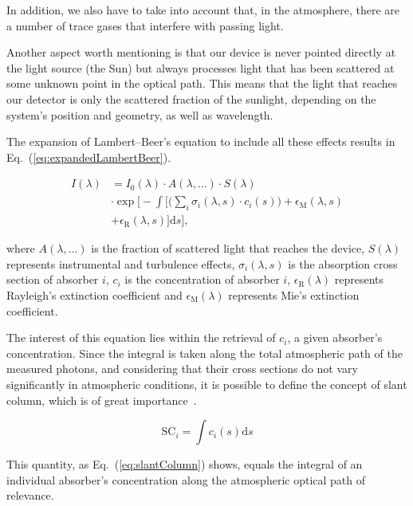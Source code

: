 In addition, we also have to take into account that, in the atmosphere,
there are a number of trace gases that interfere with passing light.

Another aspect worth mentioning is that our device is never pointed
directly at the light source (the Sun) but always processes light that
has been scattered at some unknown point in the optical path. This means
that the light that reaches our detector is only the scattered fraction
of the sunlight, depending on the system's position and geometry, as
well as wavelength.

The expansion of Lambert--Beer's equation to include all these effects
results in Eq.~(\ref{eq:expandedLambertBeer}).

\begin{align}
      \label{eq:expandedLambertBeer}
I(\lambda) & = I_{0}(\lambda) \cdot A(\lambda, \ldots) \cdot S(\lambda) \nonumber \\
      &\cdot
      \exp \Bigg[ - \int \Big[ \Big(\sum_{i} \sigma_{i}(\lambda, s) \cdot c_{i}(s)\Big) +
      \epsilon_\mathrm{M}(\lambda, s)\nonumber\\
      & + \epsilon_\mathrm{R}(\lambda, s) \Big]\mathrm{d}s \Bigg],
\end{align}

where $A(\lambda, \ldots)$ is the fraction of scattered light that
reaches the device, $S(\lambda)$ represents instrumental and turbulence
effects, $\sigma_{i}(\lambda, s)$ is the absorption cross section of
absorber $i$, $c_{i}$ is the concentration of absorber $i$,
$\epsilon_\mathrm{R}(\lambda)$ represents Rayleigh's extinction
coefficient and $\epsilon_\mathrm{M}(\lambda)$ represents Mie's
extinction coefficient.


The interest of this equation lies within the retrieval of $c_i$, a
given absorber's concentration. Since the integral is taken along the
total atmospheric path of the measured photons, and considering that
their cross sections do not vary significantly in atmospheric
conditions, it is possible to define the concept of slant column, which
is of great importance~\cite{Merlaud2013}.

\begin{equation}
      \label{eq:slantColumn}
      \mathrm{SC}_{i} = \int c_{i}(s)\mathrm{d}s
\end{equation}

This quantity, as Eq.~(\ref{eq:slantColumn}) shows, equals the integral
of an individual absorber's concentration along the atmospheric optical
path of relevance.


